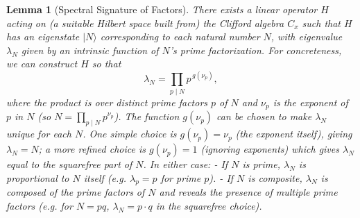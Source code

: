 \documentclass[11pt]{article}
\newtheorem{lemma}{Lemma}
\begin{document}
\begin{lemma}[Spectral Signature of Factors]\label{lem:spectral-signature}
There exists a linear operator $H$ acting on (a suitable Hilbert space built from) the Clifford algebra $C_x$ such that $H$ has an eigenstate $|N\rangle$ corresponding to each natural number $N$, with eigenvalue $\lambda_N$ given by an intrinsic function of $N$’s prime factorization. For concreteness, we can construct $H$ so that 
\[ \lambda_N = \prod_{p \mid N} p^{\,g(\nu_p)} ,\] 
where the product is over distinct prime factors $p$ of $N$ and $\nu_p$ is the exponent of $p$ in $N$ (so $N=\prod_{p\mid N} p^{\nu_p}$). The function $g(\nu_p)$ can be chosen to make $\lambda_N$ unique for each $N$. One simple choice is $g(\nu_p) = \nu_p$ (the exponent itself), giving $\lambda_N = N$; a more refined choice is $g(\nu_p)=1$ (ignoring exponents) which gives $\lambda_N$ equal to the squarefree part of $N$. In either case:
- If $N$ is prime, $\lambda_N$ is proportional to $N$ itself (e.g. $\lambda_p = p$ for prime $p$).
- If $N$ is composite, $\lambda_N$ is composed of the prime factors of $N$ and reveals the presence of multiple prime factors (e.g. for $N=pq$, $\lambda_N = p\cdot q$ in the squarefree choice).
\end{lemma}
\end{document}
